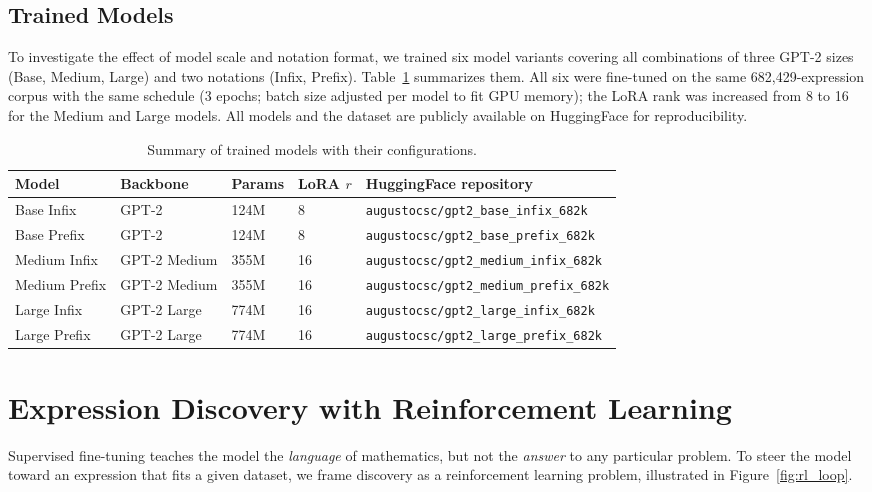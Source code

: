\subsection{Trained Models}
\label{sec:trained_models}

To investigate the effect of model scale and notation format, we trained six model variants covering all combinations of three GPT-2 sizes (Base, Medium, Large) and two notations (Infix, Prefix). Table~\ref{tab:models_trained} summarizes them. All six were fine-tuned on the same 682{,}429-expression corpus with the same schedule (3 epochs; batch size adjusted per model to fit GPU memory); the LoRA rank was increased from 8 to 16 for the Medium and Large models. All models and the dataset are publicly available on HuggingFace for reproducibility.

\begin{table}[htbp]
    \centering
    \caption{Summary of trained models with their configurations.}
    \label{tab:models_trained}
    \begin{tabular}{lllll}
    \toprule
    \textbf{Model} & \textbf{Backbone} & \textbf{Params} & \textbf{LoRA $r$} & \textbf{HuggingFace repository} \\
    \midrule
    Base Infix & GPT-2 & 124M & 8 & \texttt{augustocsc/gpt2\_base\_infix\_682k} \\
    Base Prefix & GPT-2 & 124M & 8 & \texttt{augustocsc/gpt2\_base\_prefix\_682k} \\
    Medium Infix & GPT-2 Medium & 355M & 16 & \texttt{augustocsc/gpt2\_medium\_infix\_682k} \\
    Medium Prefix & GPT-2 Medium & 355M & 16 & \texttt{augustocsc/gpt2\_medium\_prefix\_682k} \\
    Large Infix & GPT-2 Large & 774M & 16 & \texttt{augustocsc/gpt2\_large\_infix\_682k} \\
    Large Prefix & GPT-2 Large & 774M & 16 & \texttt{augustocsc/gpt2\_large\_prefix\_682k} \\
    \bottomrule
    \end{tabular}
\end{table}

\section{Expression Discovery with Reinforcement Learning}
\label{sec:expression_discovery}

Supervised fine-tuning teaches the model the \emph{language} of mathematics, but not the \emph{answer} to any particular problem. To steer the model toward an expression that fits a given dataset, we frame discovery as a reinforcement learning problem, illustrated in Figure~\ref{fig:rl_loop}.

